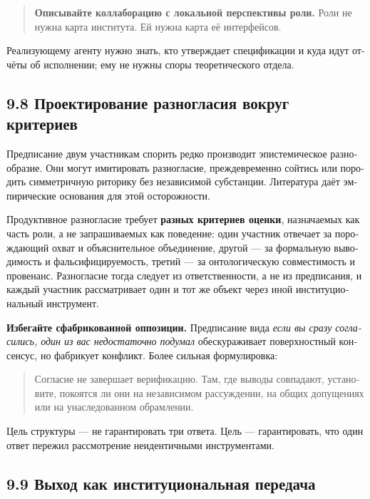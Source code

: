 \begin{russian}
\begin{quote}
\textbf{Описывайте коллаборацию с локальной перспективы роли.} Роли не нужна карта института. Ей нужна карта её интерфейсов.
\end{quote}
Реализующему агенту нужно знать, кто утверждает спецификации и куда идут отчёты об исполнении; ему не нужны споры теоретического отдела.


\subsection*{9.8 Проектирование разногласия вокруг критериев}
\label{sec:ru:9.8}

Предписание двум участникам спорить редко производит эпистемическое разнообразие. Они могут имитировать разногласие, преждевременно сойтись или породить симметричную риторику без независимой субстанции. Литература  даёт эмпирические основания для этой осторожности.

Продуктивное разногласие требует \textbf{разных критериев оценки}, назначаемых как часть роли, а не запрашиваемых как поведение: один участник отвечает за порождающий охват и объяснительное объединение, другой — за формальную выводимость и фальсифицируемость, третий — за онтологическую совместимость и провенанс. Разногласие тогда следует из ответственности, а не из предписания, и каждый участник рассматривает один и тот же объект через иной институциональный инструмент.

\textbf{Избегайте сфабрикованной оппозиции.} Предписание вида \emph{если вы сразу согласились, один из вас недостаточно подумал} обескураживает поверхностный консенсус, но фабрикует конфликт. Более сильная формулировка:

\begin{quote}
Согласие не завершает верификацию. Там, где выводы совпадают, установите, покоятся ли они на независимом рассуждении, на общих допущениях или на унаследованном обрамлении.
\end{quote}
Цель структуры  — не гарантировать три ответа. Цель — гарантировать, что один ответ пережил рассмотрение неидентичными инструментами.


\subsection*{9.9 Выход как институциональная передача}
\label{sec:ru:9.9}


\end{russian}
